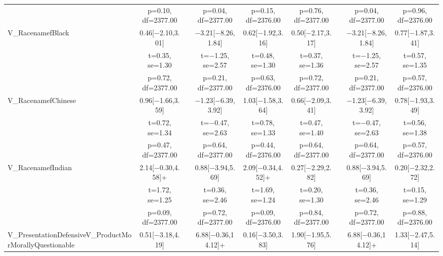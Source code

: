 \documentclass[]{report}
\begin{document}
\begin{table}
{\begin{tabular}[t]{lcccccccc}
		& p=\num{0.10}, df=\num{2377.00} &  & p=\num{0.04}, df=\num{2377.00} & p=\num{0.15}, df=\num{2376.00} & p=\num{0.76}, df=\num{2377.00} &  & p=\num{0.04}, df=\num{2377.00} & p=\num{0.96}, df=\num{2376.00}\\
		V\_RacenamefBlack & \num{0.46}[\num{-2.10},\num{3.01}] &  & \num{-3.21}[\num{-8.26},\num{1.84}] & \num{0.62}[\num{-1.92},\num{3.16}] & \num{0.50}[\num{-2.17},\num{3.17}] &  & \num{-3.21}[\num{-8.26},\num{1.84}] & \num{0.77}[\num{-1.87},\num{3.41}]\\
		& t=\num{0.35}, se=\num{1.30} &  & t=\num{-1.25}, se=\num{2.57} & t=\num{0.48}, se=\num{1.30} & t=\num{0.37}, se=\num{1.36} &  & t=\num{-1.25}, se=\num{2.57} & t=\num{0.57}, se=\num{1.35}\\
		& p=\num{0.72}, df=\num{2377.00} &  & p=\num{0.21}, df=\num{2377.00} & p=\num{0.63}, df=\num{2376.00} & p=\num{0.72}, df=\num{2377.00} &  & p=\num{0.21}, df=\num{2377.00} & p=\num{0.57}, df=\num{2376.00}\\
		V\_RacenamefChinese & \num{0.96}[\num{-1.66},\num{3.59}] &  & \num{-1.23}[\num{-6.39},\num{3.92}] & \num{1.03}[\num{-1.58},\num{3.64}] & \num{0.66}[\num{-2.09},\num{3.41}] &  & \num{-1.23}[\num{-6.39},\num{3.92}] & \num{0.78}[\num{-1.93},\num{3.49}]\\
		& t=\num{0.72}, se=\num{1.34} &  & t=\num{-0.47}, se=\num{2.63} & t=\num{0.78}, se=\num{1.33} & t=\num{0.47}, se=\num{1.40} &  & t=\num{-0.47}, se=\num{2.63} & t=\num{0.56}, se=\num{1.38}\\
		& p=\num{0.47}, df=\num{2377.00} &  & p=\num{0.64}, df=\num{2377.00} & p=\num{0.44}, df=\num{2376.00} & p=\num{0.64}, df=\num{2377.00} &  & p=\num{0.64}, df=\num{2377.00} & p=\num{0.57}, df=\num{2376.00}\\
		V\_RacenamefIndian & \num{2.14}[\num{-0.30},\num{4.58}]+ &  & \num{0.88}[\num{-3.94},\num{5.69}] & \num{2.09}[\num{-0.34},\num{4.52}]+ & \num{0.27}[\num{-2.29},\num{2.82}] &  & \num{0.88}[\num{-3.94},\num{5.69}] & \num{0.20}[\num{-2.32},\num{2.72}]\\
		& t=\num{1.72}, se=\num{1.25} &  & t=\num{0.36}, se=\num{2.46} & t=\num{1.69}, se=\num{1.24} & t=\num{0.20}, se=\num{1.30} &  & t=\num{0.36}, se=\num{2.46} & t=\num{0.15}, se=\num{1.29}\\
		& p=\num{0.09}, df=\num{2377.00} &  & p=\num{0.72}, df=\num{2377.00} & p=\num{0.09}, df=\num{2376.00} & p=\num{0.84}, df=\num{2377.00} &  & p=\num{0.72}, df=\num{2377.00} & p=\num{0.88}, df=\num{2376.00}\\
		V\_PresentationDefensiveV\_ProductMorMorallyQuestionable & \num{0.51}[\num{-3.18},\num{4.19}] &  & \num{6.88}[\num{-0.36},\num{14.12}]+ & \num{0.16}[\num{-3.50},\num{3.83}] & \num{1.90}[\num{-1.95},\num{5.76}] &  & \num{6.88}[\num{-0.36},\num{14.12}]+ & \num{1.33}[\num{-2.47},\num{5.14}]\\

\end{tabular}}
\end{table}
\end{document}
